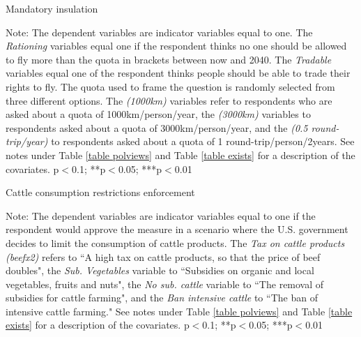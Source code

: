 \documentclass{article}
\begin{document}
\begin{landscape}
	\begin{table}[h!]
	\caption{Mandatory insulation}
	\begin{center}
		\scalebox{0.6}{}
	\end{center}
	{\footnotesize Note: The dependent variables are indicator variables equal to one. The \textit{Rationing} variables equal one if the respondent thinks no one should be allowed to fly more than the quota in brackets between now and 2040. The \textit{Tradable} variables equal one of the respondent thinks people should be able to trade their rights to fly. The quota used to frame the question is randomly selected from three different options. The \textit{(1000km)} variables refer to respondents who are asked about a quota of 1000km/person/year, the \textit{(3000km)} variables to respondents asked about a quota of 3000km/person/year, and the \textit{(0.5 round-trip/year)} to respondents asked about a quota of 1 round-trip/person/2years.  See notes under Table \ref{table polviews} and Table \ref{table exists} for a description of the covariates.
	\newline *p$<$0.1; **p$<$0.05; ***p$<$0.01}
\end{table}	
\end{landscape}

\begin{table}[h!]
	\caption{Cattle consumption restrictions enforcement}
	\begin{center}
		\scalebox{0.7}{}
	\end{center}
	{\footnotesize Note: The dependent variables are indicator variables equal to one if the respondent would approve the measure in a scenario where the U.S. government decides to limit the consumption of cattle products. The \textit{Tax on cattle products (beefx2)} refers to ``A high tax on cattle products, so that the price of beef doubles", the \textit{Sub. Vegetables} variable to ``Subsidies on organic and local vegetables, fruits and nuts", the \textit{No sub. cattle} variable to ``The removal of subsidies for cattle farming", and the \textit{Ban intensive cattle} to ``The ban of intensive cattle farming." See notes under Table \ref{table polviews} and Table \ref{table exists} for a description of the covariates.
	\newline *p$<$0.1; **p$<$0.05; ***p$<$0.01}
\end{table}	
\end{document}
